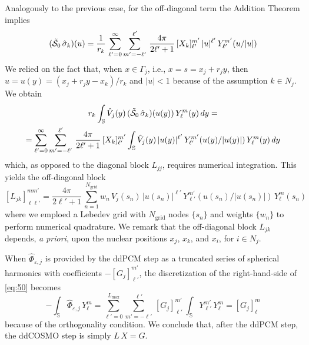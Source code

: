 Analogously to the previous case, for the off-diagonal term the Addition Theorem implies
\[
(\tilde{\mathcal{S}}_0 \, \hat{\sigma}_k)(u) = \frac{1}{r_k} \, \sum_{\ell'= 0}^{\infty} \sum_{m' = -\ell'}^{\ell'} \, \frac{4\pi}{2\ell' + 1}\, [X_k]_{\ell'}^{m'} \, |u|^{\ell'} \, Y_{\ell'}^{m'}(u/|u|)
\]
We relied on the fact that, when $x \in \Gamma_j$, i.e., $x = s = x_j + r_j y$, then $u = u(y) = (x_j + r_j y -x_k)/r_k$ and $|u| < 1$ because of the assumption $k \in N_j$. We obtain
\begin{multline*}
 r_k \int_\mathbb{S} \hat{V}_j(y) \, (\tilde{\mathcal{S}}_0 \, \hat{\sigma}_k)(u(y)) \, Y_\ell^m(y) \, dy = \\
=  \sum_{\ell'= 0}^{\infty} \sum_{m' = -\ell'}^{\ell'} \, \frac{4\pi}{2\ell' + 1}\, [X_k]_{\ell'}^{m'} \int_\mathbb{S} \hat{V}_j(y) \, |u(y)|^{\ell'} \, Y_{\ell'}^{m'}(u(y)/|u(y)|) \, Y_\ell^m(y) \, dy
\end{multline*}
which, as opposed to the diagonal block $L_{jj}$, requires numerical integration.
This yields the off-diagonal block
\begin{equation}\label{eq:62}
[L_{jk}]_{\ell \ell'}^{m m'} =  \frac{4\pi}{2\ell' + 1}\, \sum_{n = 1}^{N_\text{grid}} w_n \, \hat{V}_j(s_n) \, |u(s_n)|^{\ell'} \, Y_{\ell'}^{m'}(u(s_n)/|u(s_n)|) \, Y_\ell^m(s_n)
\end{equation}
where we emploed a Lebedev grid with $N_\text{grid}$ nodes $\{s_n\}$ and weights $\{ w_n \}$ to perform numerical quadrature. We remark that the off-diagonal block $L_{jk}$ depends, \emph{a priori}, upon the nuclear positions $x_j$, $x_k$, and $x_i$, for $i \in N_j$.

When $\hat{\Phi}_{\varepsilon,j}$ is provided by the ddPCM step as a truncated series of spherical harmonics with coefficients $-[G_j]_{\ell'}^{m'}$, the discretization of the right-hand-side of \eqref{eq:50} becomes
\[
- \int_\mathbb{S} \hat{\Phi}_{\varepsilon,j} \, Y_\ell^m =  \sum_{\ell'= 0}^{L_\text{max}} \sum_{m' = -\ell'}^{\ell'} \, [G_j]_{\ell'}^{m'} \,  \int_{\mathbb{S}}  Y_{\ell'}^{m'} \, Y_\ell^m =  [G_j]_\ell^m
\]
because of the orthogonality condition. We conclude that, after the ddPCM step, the ddCOSMO step is simply $L \, X = G$.
 

